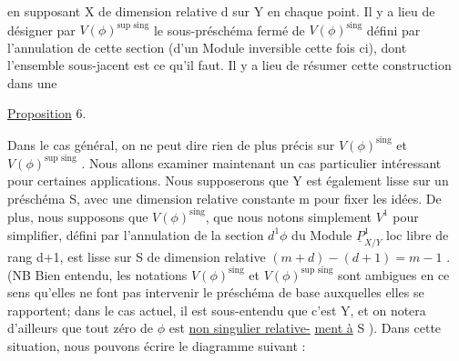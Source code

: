 
en supposant X de dimension relative d sur Y en chaque point.  Il y a
lieu de  désigner par  $V(\phi)^{\text{sup sing}}$ le sous-préschéma fermé de
 $V(\phi)^{\text{sing}}$  défini par l'annulation de cette section (d'un Module
inversible cette fois ci),  dont l'ensemble  sous-jacent est ce qu'il
faut. Il y a lieu de résumer cette construction dans une

\uline{Proposition} 6.

Dans le cas général, on ne peut  dire rien de plus précis sur
$V(\phi)^{\text{sing}}$ et $V(\phi)^{\text{sup sing}}$ .  Nous allons  examiner maintenant un cas
particulier\hand{,} intéressant pour certaines applications. Nous supposerons
que Y est également lisse sur un préschéma S, avec une dimension relative
constante m pour fixer les idées.  De plus, nous supposons que $V(\phi)^{\text{sing}}$,
que nous notons simplement $V^1$ pour simplifier, défini  par l'annulation
de la section $d^1\phi$  du Module $\underline{P}^1_{X/Y}$  loc libre de  rang d+1,
est  lisse sur S de dimension relative  $(m+d) - (d+1) = m-1$ . (NB  Bien
entendu, les notations $V(\phi)^{\text{sing}}$ et $V(\phi)^{\text{sup sing}}$ sont ambigues en ce sens
qu'elles ne font pas intervenir le préschéma de base  auxquelles elles
se rapportent; dans le cas actuel,  il est sous-entendu que c'est Y,
et on notera d'ailleurs  que tout zéro de $\phi$  est \uline{non singulier relative-}%
\uline{ment à} S ).  Dans cette situation, nous pouvons écrire  le diagramme
suivant  :


